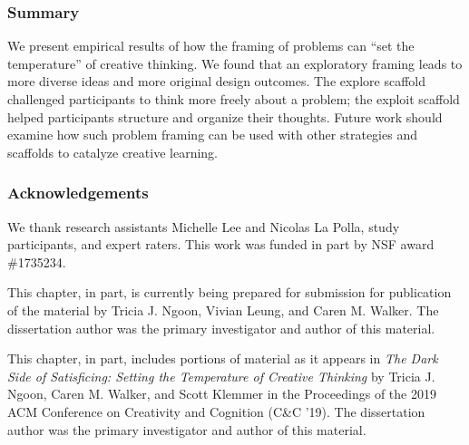 \subsubsection{Summary}
We present empirical results of how the framing of problems can ``set the temperature'' of creative thinking. We found that an exploratory framing leads to more diverse ideas and more original design outcomes. The explore scaffold challenged participants to think more freely about a problem; the exploit scaffold helped participants structure and organize their thoughts. Future work should examine how such problem framing can be used with other strategies and scaffolds to catalyze creative learning.

\subsubsection{Acknowledgements}
We thank research assistants Michelle Lee and Nicolas La Polla, study participants, and expert raters. This work was funded in part by NSF award \#1735234.

This chapter, in part, is currently being prepared for submission for publication of the material by Tricia J. Ngoon, Vivian Leung, and Caren M. Walker. The dissertation author was the primary investigator and author of this material.

This chapter, in part, includes portions of material as it appears in \textit{The Dark Side of Satisficing: Setting the Temperature of Creative Thinking} by Tricia J. Ngoon, Caren M. Walker, and Scott Klemmer in the Proceedings of the 2019 ACM Conference on Creativity and Cognition (C\&C '19). The dissertation author was the primary investigator and author of this material.